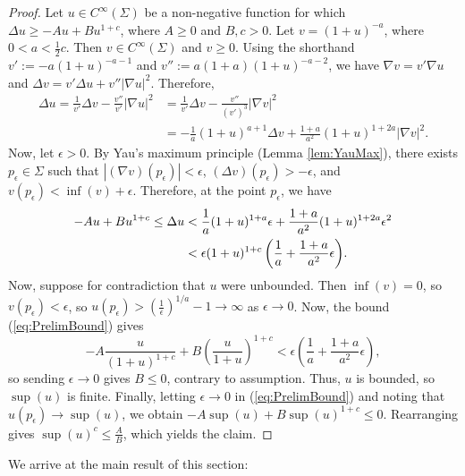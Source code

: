 \documentclass[11pt]{article}
\theoremstyle{definition}
\numberwithin{equation}{section}
\begin{document}
\begin{proof} Let $u \in C^\infty(\Sigma)$ be a non-negative function for which $\Delta u \geq -Au + Bu^{1+c}$, where $A \geq 0$ and $B,c > 0$.  Let $v = (1+u)^{-a}$, where $0 < a < \frac{1}{2}c$.  Then $v \in C^\infty(\Sigma)$ and $v \geq 0$.  Using the shorthand $v' := -a(1+u)^{-a-1}$ and $v'' := a(1+a)(1+u)^{-a-2}$, we have $\nabla v = v' \nabla u$ and $\Delta v = v' \Delta u + v'' |\nabla u|^2$.  Therefore,
\begin{align*}
\Delta u = \frac{1}{v'} \Delta v - \frac{v''}{v'} |\nabla u|^2 & = \frac{1}{v'} \Delta v - \frac{v''}{(v')^3} |\nabla v|^2 \\
& = -\frac{1}{a} (1+u)^{a+1} \Delta v + \frac{1+a}{a^2}(1+u)^{1+2a} |\nabla v|^2.
\end{align*}
Now, let $\epsilon > 0$.  By Yau's maximum principle (Lemma \ref{lem:YauMax}), there exists $p_\epsilon \in \Sigma$ such that $|(\nabla v)(p_\epsilon)| < \epsilon$, $(\Delta v)(p_\epsilon) > -\epsilon$, and $v(p_\epsilon) < \inf(v) + \epsilon$.  Therefore, at the point $p_\epsilon$, we have
\begin{align} \label{eq:PrelimBound}
-Au + Bu^{1+c} \leq \Delta u & <  \frac{1}{a} (1+u)^{1+a} \epsilon + \frac{1+a}{a^2}(1+u)^{1+2a} \epsilon^2 \notag \\
& < \epsilon(1+u)^{1+c} \left( \frac{1}{a} + \frac{1+a}{a^2} \epsilon \right)\!.
\end{align}
\indent Now, suppose for contradiction that $u$ were unbounded.  Then $\inf(v) = 0$, so $v(p_\epsilon) < \epsilon$, so $u(p_\epsilon) > (\frac{1}{\epsilon})^{1/a} - 1 \to \infty$ as $\epsilon \to 0$.  Now, the bound (\ref{eq:PrelimBound}) gives
\begin{equation}
-A \frac{u}{(1+u)^{1+c}} + B\left( \frac{u}{1+u} \right)^{1+c} < \epsilon \left( \frac{1}{a} + \frac{1+a}{a^2} \epsilon \right)\!,
\end{equation}
so sending $\epsilon \to 0$ gives $B \leq 0$, contrary to assumption.  Thus, $u$ is bounded, so $\sup(u)$ is finite.  Finally, letting $\epsilon \to 0$ in (\ref{eq:PrelimBound}) and noting that $u(p_\epsilon) \to \sup(u)$, we obtain $-A \sup(u) + B \sup(u)^{1+c} \leq 0$.  Rearranging gives $\sup(u)^c \leq \frac{A}{B}$, which yields the claim.
\end{proof}

\indent We arrive at the main result of this section:
\end{document}
